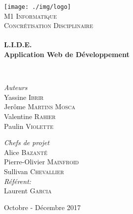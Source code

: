 \begin{titlepage}
\begin{center}

\texttt{[image: ./img/logo]}~\\[1cm]

\textsc{\LARGE M1 Informatique}\\[1.5cm]

\textsc{\Large Concrétisation Disciplinaire}\\[0.5cm]

\HRule \\[0.4cm]

{\huge \bfseries L.I.D.E.\\
Application Web de Développement \\[0.4cm] }

\HRule \\[1.5cm]

\begin{minipage}{0.4\textwidth}
\begin{flushleft} \large
\emph{Auteurs}\\
Yassine \textsc{Ibrir}\\
Jerôme \textsc{Martins Mosca}\\
Valentine \textsc{Rahier}\\
Paulin \textsc{Violette}\\
\end{flushleft}
\end{minipage}
\begin{minipage}{0.4\textwidth}
\begin{flushright} \large
\emph{Chefs de projet}\\
Alice \textsc{Bazanté}\\
Pierre-Olivier \textsc{Mainfroid}\\
Sullivan \textsc{Chevallier}\\
\emph{Référent:} \\
Laurent \textsc{Garcia}
\end{flushright}
\end{minipage}

\vfill

{\large Octobre - Décembre 2017}

\end{center}
\end{titlepage}

